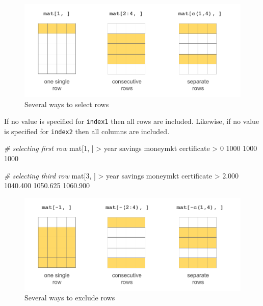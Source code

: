 \documentclass[
]{book}
\newenvironment{Shaded}{\begin{snugshade}}{\end{snugshade}}
\newcommand{\CommentTok}[1]{\textcolor[rgb]{0.56,0.35,0.01}{\textit{#1}}}
\newcommand{\DecValTok}[1]{\textcolor[rgb]{0.00,0.00,0.81}{#1}}
\newcommand{\FloatTok}[1]{\textcolor[rgb]{0.00,0.00,0.81}{#1}}
\newcommand{\NormalTok}[1]{#1}
\newcommand{\SpecialCharTok}[1]{\textcolor[rgb]{0.00,0.00,0.00}{#1}}
\begin{document}
\begin{figure}

{\centering \includegraphics[width=0.8\linewidth]{images/objects/obj-matrix-rows1} 

}

\caption{Several ways to select rows}\label{fig:unnamed-chunk-125}
\end{figure}

If no value is specified for \texttt{index1} then all rows are included. Likewise,
if no value is specified for \texttt{index2} then all columns are included.

\begin{Shaded}
\begin{Highlighting}[]
\CommentTok{\# selecting first row}
\NormalTok{mat[}\DecValTok{1}\NormalTok{, ]}
\SpecialCharTok{\textgreater{}}\NormalTok{        year     savings    moneymkt certificate }
\SpecialCharTok{\textgreater{}}           \DecValTok{0}        \DecValTok{1000}        \DecValTok{1000}        \DecValTok{1000}

\CommentTok{\# selecting third row}
\NormalTok{mat[}\DecValTok{3}\NormalTok{, ]}
\SpecialCharTok{\textgreater{}}\NormalTok{        year     savings    moneymkt certificate }
\SpecialCharTok{\textgreater{}}       \FloatTok{2.000}    \FloatTok{1040.400}    \FloatTok{1050.625}    \FloatTok{1060.900}
\end{Highlighting}
\end{Shaded}

\begin{figure}

{\centering \includegraphics[width=0.8\linewidth]{images/objects/obj-matrix-rows2} 

}

\caption{Several ways to exclude rows}\label{fig:unnamed-chunk-127}
\end{figure}
\end{document}
